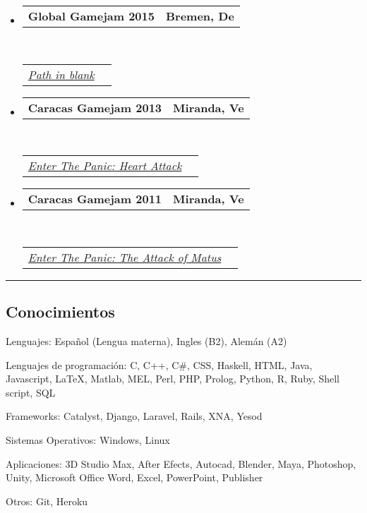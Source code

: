 \documentclass[10pt,letterpaper]{article}
\makeatletter
\newenvironment{indentsection}[1]%
{\begin{list}{}%
	{\setlength{\leftmargin}{#1}}%
	\item[]%
}
{\end{list}}
\newcommand{\headerrow}[2]
{\begin{tabular*}{\linewidth}{l@{\extracolsep{\fill}}r}
	#1 &
	#2 \\
\end{tabular*}}
\makeatother
\begin{document}
\begin{itemize}
	\parskip=0.1em
\item 
   \headerrow
   {\textbf{Global Gamejam 2015}}
   {\textbf{Bremen, De}}
  \\
  \headerrow
   {\emph{\href{http://globalgamejam.org/2015/games/path-blank}{Path in blank}}}{}
\item 
   \headerrow
   {\textbf{Caracas Gamejam 2013}}
   {\textbf{Miranda, Ve}}
	\\
	\headerrow
   {\emph{\href{http://globalgamejam.org/2013/enter-panic-heart-attack}{Enter The Panic: Heart Attack}}}{}
\item 
   \headerrow
   {\textbf{Caracas Gamejam 2011}}
   {\textbf{Miranda, Ve}}
	\\
	\headerrow
   {\emph{\href{http://archive.globalgamejam.org/2011/enter-panic-attack-matus}{Enter The Panic: The Attack of Matus}}}{}
\end{itemize}


\hrule
\vspace{-0.4em}
\subsection*{Conocimientos}

\begin{indentsection}{\parindent}
\begin{description*}
	
\item[Lenguajes:]
  Español (Lengua materna), Ingles (B2), Alemán (A2)
\item[Lenguajes de programación:]
  C, C++, C\#, CSS, Haskell, HTML, Java, Javascript, \LaTeX, Matlab, MEL, Perl, PHP, Prolog, Python, R, Ruby, Shell script, SQL
\item[Frameworks:]
  Catalyst, Django, Laravel, Rails, XNA, Yesod
\item[Sistemas Operativos:]
  Windows, Linux
\item[Aplicaciones:]
  3D Studio Max, After Efects, Autocad, Blender, Maya, Photoshop, Unity, Microsoft Office Word, Excel, PowerPoint, Publisher
\item[Otros:]
  Git, Heroku
  
\end{description*}
\end{indentsection}
\end{document}

